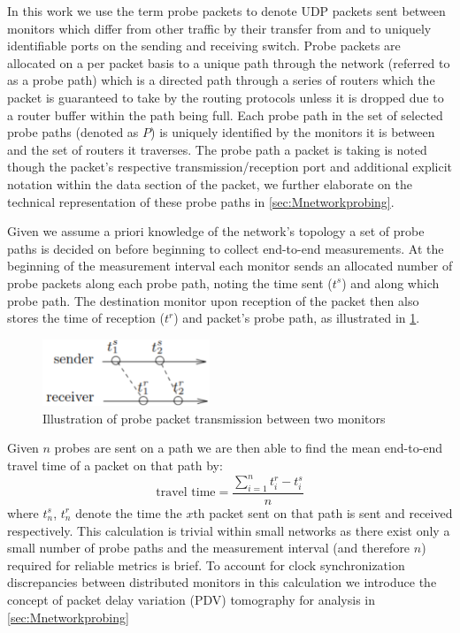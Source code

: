     In this work we use the term probe packets to denote UDP packets sent between monitors which differ from other traffic by their transfer from and to uniquely identifiable ports on the sending and receiving switch. Probe packets are allocated on a per packet basis to a unique path through the network (referred to as a probe path) which is a directed path through a series of routers which the packet is guaranteed to take by the routing protocols unless it is dropped due to a router buffer within the path being full. Each probe path in the set of selected probe paths (denoted as $P$) is uniquely identified by the monitors it is between and the set of routers it traverses. The probe path a packet is taking is noted though the packet's respective transmission/reception port and additional explicit notation within the data section of the packet, we further elaborate on the technical representation of these probe paths in \cref{sec:Mnetworkprobing}.\par
    
    Given we assume a priori knowledge of the network's topology a set of probe paths is decided on before beginning to collect end-to-end measurements. At the beginning of the measurement interval each monitor sends an allocated number of probe packets along each probe path, noting the time sent ($t^s$) and along which probe path. The destination monitor upon reception of the packet then also stores the time of reception ($t^r$) and packet's probe path, as illustrated in \ref{fig:pptransmission}. 
    \begin{figure}[H]
        \centering
        \includegraphics[width=5cm]{figs/background/probe_transmission.png}
        \caption[Illustration of probe packet transmission between two monitors]{Illustration of probe packet transmission between two monitors \protect\cite{he_fisher_2015}}
        \label{fig:pptransmission}
    \end{figure}\newpage
    \noindent Given $n$ probes are sent on a path we are then able to find the mean end-to-end travel time of a packet on that path by: \[\text{travel time}=\frac{\sum_{i=1}^nt_i^r - t_i^s}{n}\] where $t_n^s$, $t_n^r$ denote the time the $x$th packet sent on that path is sent and received respectively. This calculation is trivial within small networks as there exist only a small number of probe paths and the measurement interval (and therefore $n$) required for reliable metrics is brief. To account for clock synchronization discrepancies between distributed monitors in this calculation we introduce the concept of packet delay variation (PDV) tomography for analysis in \cref{sec:Mnetworkprobing} \par


